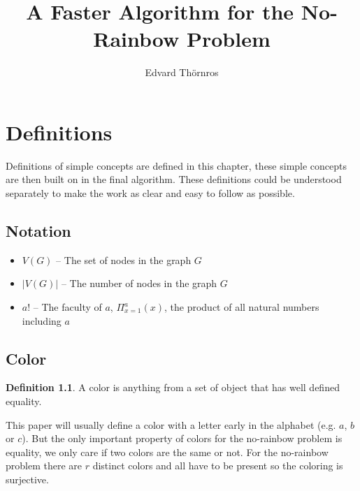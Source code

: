\documentclass{book}
\title{A Faster Algorithm for the No-Rainbow Problem}
\author{Edvard Thörnros}
\theoremstyle{definition}
\newtheorem{definition}{Definition}[section]
\begin{document}
\maketitle

\tableofcontents




% 

\chapter{Definitions}
Definitions of simple concepts are defined in this chapter, these simple concepts are then built on in the final algorithm. These definitions could be understood separately to make the work as clear and easy to follow as possible.

\section{Notation}
\begin{itemize}
  \item $V(G)$ -- The set of nodes in the graph $G$ 
  \item $|V(G)|$ -- The number of nodes in the graph $G$ 
  \item $a!$ -- The faculty of $a$, $\Pi_{x=1}^a(x)$, the product of all natural numbers including $a$
\end{itemize}

\section{Color} \label{def:color-order}
\begin{definition} 
  A color is anything from a set of object that has well defined equality.
\end{definition}
This paper will usually define a color with a letter early in the alphabet (e.g. $a$, $b$ or $c$). But the only important property of colors for the no-rainbow problem is equality, we only care if two colors are the same or not. For the no-rainbow problem there are $r$ distinct colors and all have to be present so the coloring is surjective.
\end{document}

